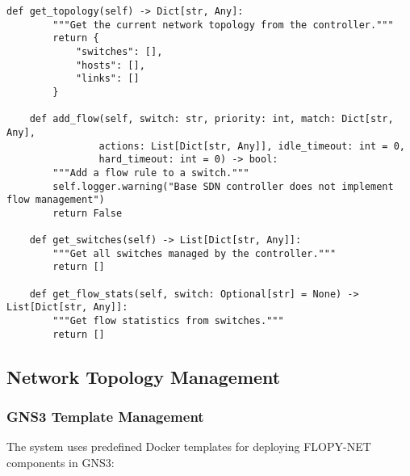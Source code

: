 \begin{lstlisting}[style=pythoncode, caption=SDN Controller Implementation]
    def get_topology(self) -> Dict[str, Any]:
        """Get the current network topology from the controller."""
        return {
            "switches": [],
            "hosts": [],
            "links": []
        }
        
    def add_flow(self, switch: str, priority: int, match: Dict[str, Any], 
                actions: List[Dict[str, Any]], idle_timeout: int = 0, 
                hard_timeout: int = 0) -> bool:
        """Add a flow rule to a switch."""
        self.logger.warning("Base SDN controller does not implement flow management")
        return False
        
    def get_switches(self) -> List[Dict[str, Any]]:
        """Get all switches managed by the controller."""
        return []
        
    def get_flow_stats(self, switch: Optional[str] = None) -> List[Dict[str, Any]]:
        """Get flow statistics from switches."""
        return []
\end{lstlisting}

\subsection{Network Topology Management}

\subsubsection{GNS3 Template Management}

The system uses predefined Docker templates for deploying FLOPY-NET components in GNS3:

